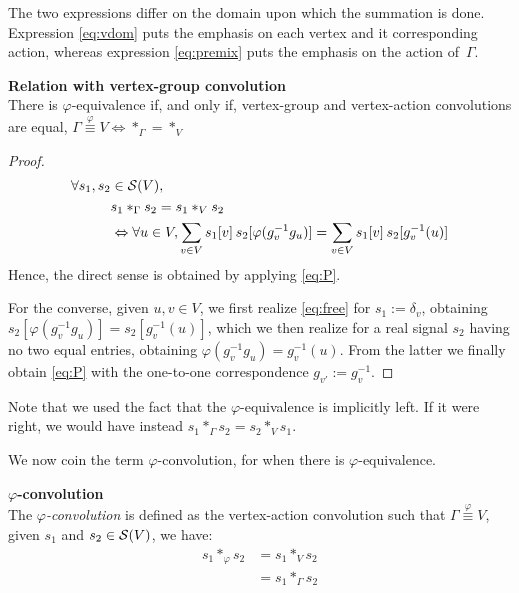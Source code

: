 The two expressions differ on the domain upon which the summation is done. Expression \eqref{eq:vdom} puts the emphasis on each vertex and it corresponding action, whereas expression \eqref{eq:premix} puts the emphasis on the action of~$\Gamma$.

\begin{lemma}\textbf{Relation with vertex-group convolution}\\
There is $\varphi$-equivalence if, and only if, vertex-group and vertex-action convolutions are equal, \ie
$\Gamma \overset{\varphi}{\equiv} V \Leftrightarrow \ast_{\Gamma} = \ast_{V}$
\label{lem:rel23}
\end{lemma}
\begin{proof}
\begin{align}
\forall s_1, s_2 & \in \cs(V),\nonumber\\
& s_1 \ast_{\Gamma} s_2 = s_1 \ast_{V} s_2 \nonumber\\
& \Leftrightarrow \forall u \in V,
\displaystyle \sum_{v \in V} s_1[v] \h{2} s_2[\varphi(g_v^{-1}g_u)] = \displaystyle \sum_{v \in V} s_1[v] \h{2} s_2[g_v^{-1}(u)] \label{eq:free}
\end{align}
Hence, the direct sense is obtained by applying \eqref{eq:P}.

For the converse, given $u, v \in V$, we first realize \eqref{eq:free} for $s_1 := \delta_v$, obtaining $s_2[\varphi(g_v^{-1}g_u)] = s_2[g_v^{-1}(u)]$, which we then realize for a real signal $s_2$ having no two equal entries, obtaining $\varphi(g_v^{-1}g_u) = g_v^{-1}(u)$. From the latter we finally obtain \eqref{eq:P} with the one-to-one correspondence $g_{v'} := g_v^{-1}$.
\end{proof}

\begin{remark}Note that we used the fact that the $\varphi$-equivalence is implicitly left. If it were right, we would have instead $s_1 \ast_{\Gamma} s_2 = s_2 \ast_{V} s_1$.

\end{remark}

We now coin the term $\varphi$-convolution, for when there is $\varphi$-equivalence.

\begin{definition}\textbf{$\varphi$-convolution}\\
The \emph{$\varphi$-convolution} is defined as the vertex-action convolution such that $\Gamma \overset{\varphi}{\equiv} V$, \ie given $s_1$ and $s_2 \in \cs(V)$, we have:
\begin{align*}
s_1 \ast_{\varphi} s_2 &= s_1 \ast_{V} s_2\\
&= s_1 \ast_{\Gamma} s_2
\end{align*}
\label{def:convv}
\end{definition}

